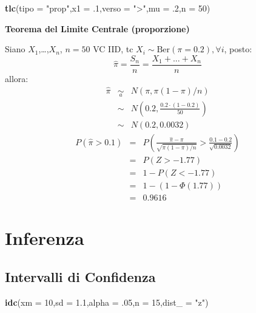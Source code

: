 \documentclass[
  11pt,
]{book}
\newenvironment{Shaded}{\begin{snugshade}}{\end{snugshade}}
\newcommand{\AttributeTok}[1]{\textcolor[rgb]{0.13,0.29,0.53}{#1}}
\newcommand{\DecValTok}[1]{\textcolor[rgb]{0.00,0.00,0.81}{#1}}
\newcommand{\FloatTok}[1]{\textcolor[rgb]{0.00,0.00,0.81}{#1}}
\newcommand{\FunctionTok}[1]{\textcolor[rgb]{0.13,0.29,0.53}{\textbf{#1}}}
\newcommand{\NormalTok}[1]{#1}
\newcommand{\StringTok}[1]{\textcolor[rgb]{0.31,0.60,0.02}{#1}}
\theoremstyle{mytheoremstyle}
\theoremstyle{mydefstyle}
\begin{document}
\begin{Shaded}
\begin{Highlighting}[]
\FunctionTok{tlc}\NormalTok{(}\AttributeTok{tipo =} \StringTok{"prop"}\NormalTok{,}\AttributeTok{x1 =}\NormalTok{ .}\DecValTok{1}\NormalTok{,}\AttributeTok{verso =} \StringTok{"\textgreater{}"}\NormalTok{,}\AttributeTok{mu =}\NormalTok{ .}\DecValTok{2}\NormalTok{,}\AttributeTok{n =} \DecValTok{50}\NormalTok{)}
\end{Highlighting}
\end{Shaded}

\textbf{Teorema del Limite Centrale (proporzione)}

Siano \(X_1\),\ldots,\(X_n\), \(n=50\) VC IID, tc \(X_i\sim\text{Ber}(\pi=0.2)\)\(,\forall i\), posto:
\[
      \hat\pi=\frac{S_n}n = \frac{X_1 + ... + X_n}n
      \]
allora:\begin{eqnarray*}
  \hat\pi & \mathop{\sim}\limits_{a}& N(\pi,\pi(1-\pi)/n) \\
  &\sim & N\left(0.2,\frac{0.2\cdot(1-0.2)}{50}\right) \\
     &\sim & N(0.2,0.0032) 
  \end{eqnarray*}\begin{eqnarray*}
      P( \hat\pi   >   0.1 ) 
        &=& P\left(  \frac { \hat\pi  -  \pi }{ \sqrt{\pi(1-\pi)/n} }  >  \frac { 0.1  -  0.2 }{\sqrt{ 0.0032 }} \right)  \\
                 &=& P\left(  Z   >   -1.77 \right) \\    &=& 1-P(Z< -1.77 )\\ 
                 &=&  1-(1-\Phi( 1.77 )) \\ &=&  0.9616 
      \end{eqnarray*}

\section{Inferenza}\label{inferenza-1}

\subsection{Intervalli di Confidenza}\label{intervalli-di-confidenza}

\begin{Shaded}
\begin{Highlighting}[]
\FunctionTok{idc}\NormalTok{(}\AttributeTok{xm =} \DecValTok{10}\NormalTok{,}\AttributeTok{sd =} \FloatTok{1.1}\NormalTok{,}\AttributeTok{alpha =}\NormalTok{ .}\DecValTok{05}\NormalTok{,}\AttributeTok{n =} \DecValTok{15}\NormalTok{,}\AttributeTok{dist\_ =} \StringTok{"z"}\NormalTok{)}
\end{Highlighting}
\end{Shaded}
\end{document}
